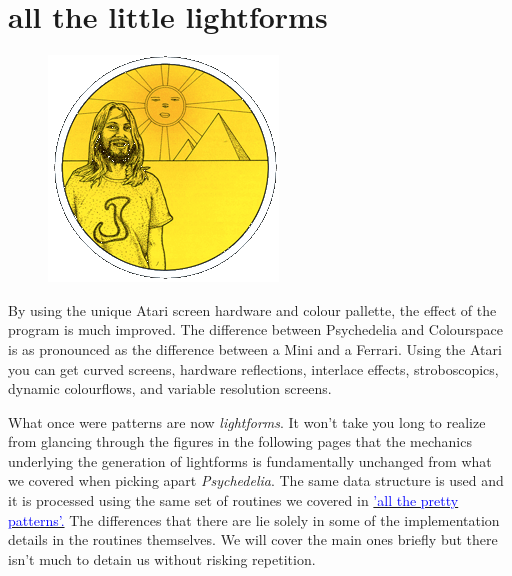 \chapter{all the little lightforms} 
\label{sec:lightforms}
\lstset{style=6502Style}
\lstset{ 
   aboveskip=5pt,
   belowskip=0pt,
}

\begin{definition}
\setlength{\intextsep}{0pt}%
\setlength{\columnsep}{3pt}%
\begin{figure}
\includegraphics[width=\linewidth]{src/callout/psych.png} 
\end{figure}
\small
By using the
unique Atari screen hardware and colour pallette, the effect of the program is
much improved.  The difference between Psychedelia and Colourspace is as
pronounced as the difference between a Mini and a Ferrari.  Using the Atari you
can get curved screens, hardware reflections, interlace effects, stroboscopics,
dynamic colourflows, and variable resolution screens.  
\end{definition}

What once were patterns are now \textit{lightforms}. It won't take you long to realize
from glancing through the figures in the following pages that the mechanics underlying
the generation of lightforms is fundamentally unchanged from what we covered when
picking apart \textit{Psychedelia}. The same data structure is used and it is processed
using the same set of routines we covered in 
\hyperref[sec:patterns]{\textcolor{blue}{'all the pretty patterns'.}} 
The differences that there are lie solely in some of the implementation details in the
routines themselves. We will cover the main ones briefly but there isn't much to detain
us without risking repetition. 

